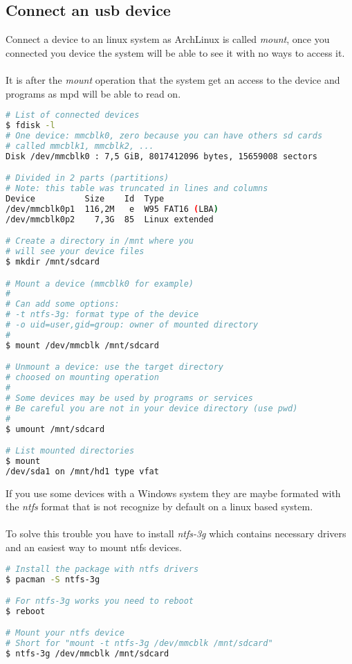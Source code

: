 \subsection{Connect an usb device}
Connect a device to an linux system as ArchLinux is called \emph{mount}, once you
connected you device the system will be able to see it with no ways to access it.
\\\\
It is after the \emph{mount} operation that the system get an access to the device 
and programs as mpd will be able to read on.

\begin{lstlisting}[language=bash,caption=Mount an external device]
# List of connected devices
$ fdisk -l
# One device: mmcblk0, zero because you can have others sd cards 
# called mmcblk1, mmcblk2, ...
Disk /dev/mmcblk0 : 7,5 GiB, 8017412096 bytes, 15659008 sectors

# Divided in 2 parts (partitions)
# Note: this table was truncated in lines and columns
Device          Size    Id  Type
/dev/mmcblk0p1  116,2M   e  W95 FAT16 (LBA)
/dev/mmcblk0p2    7,3G  85  Linux extended

# Create a directory in /mnt where you
# will see your device files
$ mkdir /mnt/sdcard

# Mount a device (mmcblk0 for example)
#
# Can add some options:
# -t ntfs-3g: format type of the device
# -o uid=user,gid=group: owner of mounted directory
#
$ mount /dev/mmcblk /mnt/sdcard

# Unmount a device: use the target directory
# choosed on mounting operation
#
# Some devices may be used by programs or services
# Be careful you are not in your device directory (use pwd)
#
$ umount /mnt/sdcard

# List mounted directories
$ mount
/dev/sda1 on /mnt/hd1 type vfat 
\end{lstlisting}

If you use some devices with a Windows system they are maybe formated with the 
\emph{ntfs} format that is not recognize by default on a linux based system.
\\\\
To solve this trouble you have to install \emph{ntfs-3g} which contains 
necessary drivers and an easiest way to mount ntfs devices.
\begin{lstlisting}[language=bash,caption=Mount ntfs devices]
# Install the package with ntfs drivers
$ pacman -S ntfs-3g

# For ntfs-3g works you need to reboot
$ reboot

# Mount your ntfs device
# Short for "mount -t ntfs-3g /dev/mmcblk /mnt/sdcard"
$ ntfs-3g /dev/mmcblk /mnt/sdcard
\end{lstlisting}

